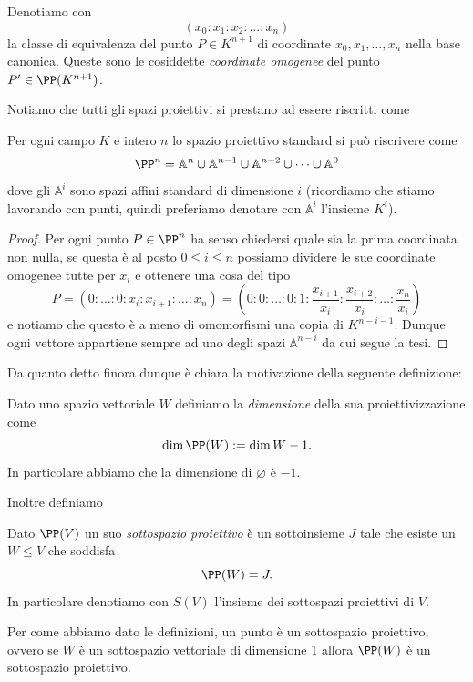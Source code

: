 \documentclass[11pt]{scrartcl}
\newcommand{\eset}{\varnothing}
\renewcommand{\AA}{\mathbb{A}}
\begin{document}
   	 \begin{definition}
   	 	Denotiamo con 
   	 	$$(x_0:x_1:x_2:\dots:x_n)$$
   	 	la classe di equivalenza del punto $P\in K^{n+1}$ di coordinate $x_0,x_1,\dots,x_n$ nella base canonica. Queste sono le cosiddette \textit{coordinate omogenee} del punto $P'\in \PP(K^{n+1})$.
   	 \end{definition}
   	 Notiamo che tutti gli spazi proiettivi si prestano ad essere riscritti come
   	 \begin{lemma}
   	 	Per ogni campo $K$ e intero $n$ lo spazio proiettivo standard si può riscrivere come
   	 	$$\PP^n=\AA^{n}\cup \AA^{n-1}\cup \AA^{n-2}\cup\dots\cup \AA^0$$
   	 	dove gli $\AA^i$ sono spazi affini standard di dimensione $i$ (ricordiamo che stiamo lavorando con punti, quindi preferiamo denotare con $\AA^i$ l'insieme $K^i$).
   	 \end{lemma}
   	 \begin{proof}
   	 	Per ogni punto $P\in\PP^n$ ha senso chiedersi quale sia la prima coordinata non nulla, se questa è al posto $0\le i\le n$ possiamo dividere le sue coordinate omogenee tutte per $x_i$ e ottenere una cosa del tipo
   	 	$$P=\left(0:\dots:0:x_i:x_{i+1}:\dots:x_n\right)=\left(0:0:\dots:0:1:\frac{x_{i+1}}{x_i}:\frac{x_{i+2}}{x_i}:\dots:\frac{x_n}{x_i}\right)$$
   	 	e notiamo che questo è a meno di omomorfismi una copia di $K^{n-i-1}$. Dunque ogni vettore appartiene sempre ad uno degli spazi $\AA^{n-i}$ da cui segue la tesi.
   	 \end{proof}
   	 Da quanto detto finora dunque è chiara la motivazione della seguente definizione:
   	 \begin{definition}
   	 	Dato uno spazio vettoriale $W$ definiamo la \textit{dimensione} della sua proiettivizzazione come 
   	 	$$\dim\PP(W):=\dim W-1.$$
   	 	In particolare abbiamo che la dimensione di $\eset$ è $-1$. 
   	 \end{definition}
   	 Inoltre definiamo
   	 \begin{definition}
   	 	Dato $\PP(V)$ un suo \textit{sottospazio proiettivo} è un sottoinsieme $J$ tale che esiste un $W\le V$ che soddisfa
   	 	$$\PP(W)=J.$$
   	 	In particolare denotiamo con $S(V)$ l'insieme dei sottospazi proiettivi di $V$.
   	 \end{definition}
   	 \begin{remark}
   	 	Per come abbiamo dato le definizioni, un punto è un sottospazio proiettivo, ovvero se $W$ è un sottospazio vettoriale di dimensione $1$ allora $\PP(W)$ è un sottospazio proiettivo.
   	 \end{remark}
\end{document}
